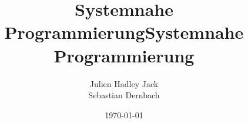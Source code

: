 \documentclass[
    pagesize=pdftex,    %
    twoside=false,      %
    fontsize=12pt,      %
    parskip=half,       %
    headsepline,        %
    footsepline,        %
    abstract=false,     %
    listof=totoc,       %
    toc=bibliography,   %
]{scrreprt}
\title{Systemnahe Programmierung}
\author{}
\date{\today}
\begin{document}



\title{Systemnahe Programmierung}



\author{
        Julien Hadley Jack \\
        Sebastian Dernbach \\
       }


\maketitle

\newpage



\pagestyle{plain}
\setcounter{tocdepth}{2}
\tableofcontents
\newpage












\clearpage
{}

\cleardoublepage
\listoffigures

\cleardoublepage
\listoftables


\cleardoublepage
\printbibliography

\cleardoublepage


\printglossary[style=altlist,title=Glossar]
\end{document}
